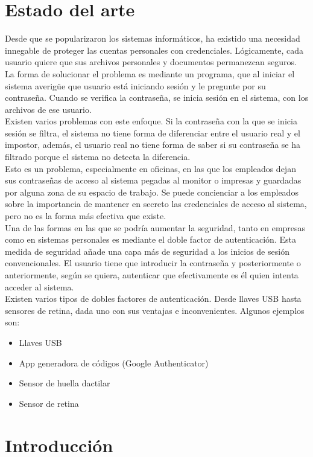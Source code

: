 \documentclass[titlepage]{article}
\begin{document}
\section{Estado del arte}
Desde que se popularizaron los sistemas informáticos, ha existido una necesidad innegable de proteger las cuentas personales con credenciales. Lógicamente, cada usuario quiere que sus archivos personales y documentos permanezcan seguros. La forma de solucionar el problema es mediante un programa, que al iniciar el sistema averigüe que usuario está iniciando sesión y le pregunte por su contraseña. Cuando se verifica la contraseña, se inicia sesión en el sistema, con los archivos de ese usuario.\\Existen varios problemas con este enfoque. Si la contraseña con la que se inicia sesión se filtra, el sistema no tiene forma de diferenciar entre el usuario real y el impostor, además, el usuario real no tiene forma de saber si su contraseña se ha filtrado porque el sistema no detecta la diferencia.\\Esto es un problema, especialmente en oficinas, en las que los empleados dejan sus contraseñas de acceso al sistema pegadas al monitor o impresas y guardadas por alguna zona de su espacio de trabajo. Se puede concienciar a los empleados sobre la importancia de mantener en secreto las credenciales de acceso al sistema, pero no es la forma más efectiva que existe.\\Una de las formas en las que se podría aumentar la seguridad, tanto en empresas como en sistemas personales es mediante el doble factor de autenticación. Esta medida de seguridad añade una capa más de seguridad a los inicios de sesión convencionales. El usuario tiene que introducir la contraseña y posteriormente o anteriormente, según se quiera, autenticar que efectivamente es él quien intenta acceder al sistema.\\Existen varios tipos de dobles factores de autenticación. Desde llaves USB hasta sensores de retina, dada uno con sus ventajas e inconvenientes. Algunos ejemplos son:
\begin{itemize}
	\item Llaves USB
	\item App generadora de códigos (Google Authenticator)
	\item Sensor de huella dactilar
	\item Sensor de retina
\end{itemize}
\section{Introducción}
\end{document}
